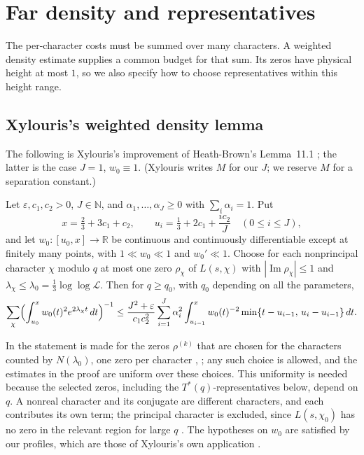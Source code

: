 \documentclass[11pt]{amsart}
\numberwithin{equation}{section}
\theoremstyle{plain}
\theoremstyle{definition}
\theoremstyle{remark}
\newcommand{\LL}{\mathcal{L}}
\newcommand{\RR}{\mathbb{R}}
\newcommand{\NN}{\mathbb{N}}
\renewcommand{\Im}{\operatorname{Im}}
\newcommand{\eps}{\varepsilon}
\newcommand{\1}{\mathbf{1}}
\begin{document}
\section{Far density and representatives}\label{sec:far}

The per-character costs must be summed over many characters. A weighted density
estimate supplies a common budget for that sum. Its zeros have physical height at most
$1$, so we also specify how to choose representatives within this height range.

\subsection{Xylouris's weighted density lemma}
The following is Xylouris's improvement \cite[Lemma~5.1, (5.19), p.~66]{Xylouris2011nullstellen} of
Heath-Brown's Lemma~11.1 \cite{HeathBrown1992zero}; the latter is the case $J=1$, $w_0\equiv1$.
(Xylouris writes $M$ for our $J$; we reserve $M$ for a separation constant.)

\begin{inp}\label{inp:far}
Let $\eps,c_1,c_2>0$, $J\in\NN$, and $\alpha_1,\dots,\alpha_J\ge0$ with $\sum_i\alpha_i=1$. Put
\[
  x=\tfrac23+3c_1+c_2,\qquad u_i=\tfrac13+2c_1+\frac{ic_2}{J}\quad(0\le i\le J),
\]
and let $w_0:[u_0,x]\to\RR$ be continuous and continuously differentiable except at finitely many
points, with $1\ll w_0\ll1$ and $w_0'\ll1$. Choose for each nonprincipal character $\chi$ modulo
$q$ at most one zero $\rho_\chi$ of $L(s,\chi)$ with $|\Im\rho_\chi|\le1$ and
$\lambda_\chi\le\lambda_0=\frac13\log\log\LL$. Then for $q\ge q_0$, with $q_0$ depending on all
the parameters,
\[
  \sum_\chi\Bigl(\int_{u_0}^xw_0(t)^2e^{2\lambda_\chi t}\,dt\Bigr)^{-1}\le
  \frac{J^2+\eps}{c_1c_2^2}\sum_{i=1}^J\alpha_i^2\int_{u_{i-1}}^xw_0(t)^{-2}
  \min\{t-u_{i-1},\,u_i-u_{i-1}\}\,dt .
\]
\end{inp}

In \cite{Xylouris2011nullstellen} the statement is made for the zeros $\rho^{(k)}$ that are chosen
for the characters counted by $N(\lambda_0)$, one zero per character \cite[\S3.2.2,
pp.~25--26]{Xylouris2011nullstellen}, \cite[\S11]{HeathBrown1992zero}; any such choice is allowed, and
the estimates in the proof \cite[pp.~67--72]{Xylouris2011nullstellen} are uniform over
these choices. This uniformity is needed because the selected zeros, including the
$T^*(q)$-representatives below, depend on $q$. A nonreal character and
its conjugate are different characters, and each contributes its own term; the principal
character is excluded, since $L(s,\chi_0)$ has no zero in the relevant region for large $q$
\cite[p.~21]{Xylouris2011nullstellen}. The hypotheses on $w_0$ are satisfied by our profiles, which
are those of Xylouris's own application \cite[(6.20)--(6.21), p.~80]{Xylouris2011nullstellen}.
\end{document}

